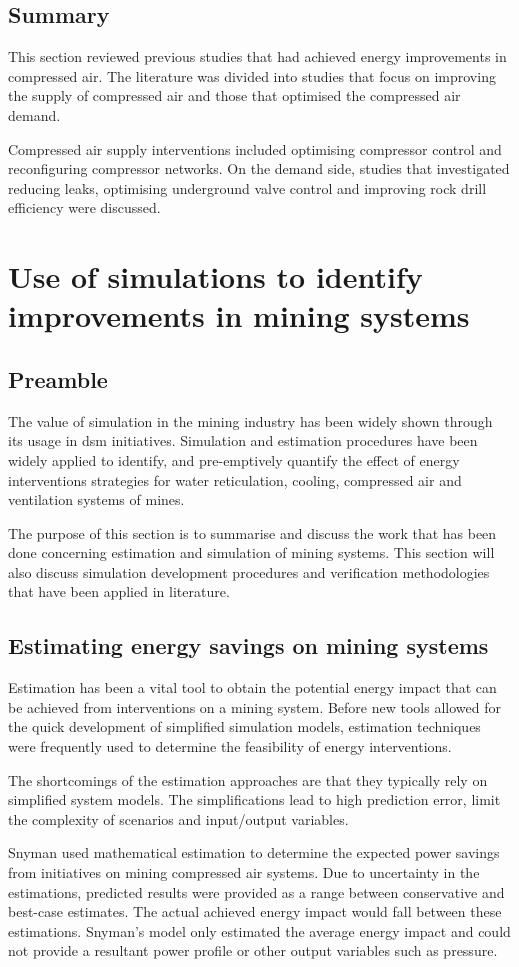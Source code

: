 	\subsection{Summary}
	This section reviewed previous studies that had achieved energy improvements in compressed air. The literature was divided into studies that focus on improving the supply of compressed air and those that optimised the compressed air demand.
	\par
	Compressed air supply interventions included optimising compressor control and reconfiguring compressor networks. On the demand side, studies that investigated reducing leaks, optimising underground valve control and improving rock drill efficiency were discussed.
\section{Use of simulations to identify improvements in mining systems}
	\subsection{Preamble}
	The value of simulation in the mining industry has been widely shown through its usage in \gls{dsm} initiatives. Simulation and estimation procedures have been widely applied to identify, and pre-emptively quantify the effect of energy interventions strategies for water reticulation, cooling, compressed air and ventilation systems of mines.
	\par
	 The purpose of this section is to summarise and discuss the work that has been done concerning estimation and simulation of mining systems. This section will also discuss simulation development procedures and verification methodologies that have been applied in literature.
	
	\subsection{Estimating energy savings on mining systems }
	Estimation has been a vital tool to obtain the potential energy impact that can be achieved from interventions on a mining system. Before new tools allowed for the quick development of simplified simulation models, estimation techniques were frequently used to determine the feasibility of energy interventions. 
	\par 
	The shortcomings of the estimation approaches are that they typically rely on simplified system models. The simplifications lead to high prediction error, limit the complexity of scenarios and input/output variables.
		\par 
	Snyman \cite{Snyman2011Masters} used mathematical estimation to determine the expected power savings from initiatives on mining compressed air systems. Due to uncertainty in the estimations, \cite{Snyman2011Masters} predicted results were provided as a range between conservative and best-case estimates. The actual achieved energy impact would fall between these estimations. Snyman's model only estimated the average energy impact and could not provide a resultant power profile or other output variables such as pressure.
		 	
